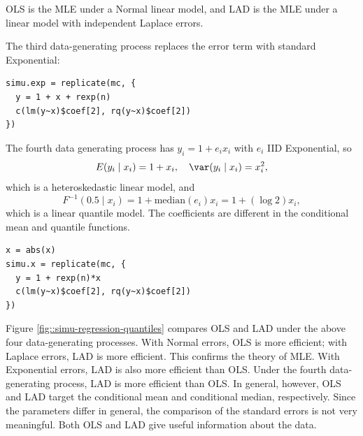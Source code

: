 OLS is the MLE under a Normal linear model, and LAD is the MLE under a linear model with independent Laplace errors. 


The third data-generating process replaces the error term with standard Exponential:


\begin{lstlisting}
simu.exp = replicate(mc, {
  y = 1 + x + rexp(n) 
  c(lm(y~x)$coef[2], rq(y~x)$coef[2])
})
\end{lstlisting}

The fourth data generating process has $y_i = 1+e_i x_i$ with $e_i$ IID Exponential, so 
$$
E(y_i \mid x_i) = 1+x_i,\quad \var(y_i\mid x_i) = x_i^2,
$$
which is a heteroskedastic linear model,
and
$$
F^{-1}(0.5\mid x_i) = 1 + \text{median}(e_i) x_i = 1+ ( \log 2) x_i,
$$
which is a linear quantile model. The coefficients are different in the conditional mean and quantile functions. 


\begin{lstlisting}
x = abs(x)
simu.x = replicate(mc, {
  y = 1 + rexp(n)*x
  c(lm(y~x)$coef[2], rq(y~x)$coef[2])
})
\end{lstlisting}

Figure \ref{fig::simu-regression-quantiles} compares OLS and LAD under the above four data-generating processes. With Normal errors, OLS is more efficient; with Laplace errors, LAD is more efficient. This confirms the theory of MLE. With Exponential errors, LAD is also more efficient than OLS. Under the fourth data-generating process, LAD is more efficient than OLS. In general, however, OLS and LAD target the conditional mean and conditional median, respectively. Since the parameters differ in general,   the comparison of the standard errors is not very meaningful. Both OLS and LAD give useful information about the data. 




